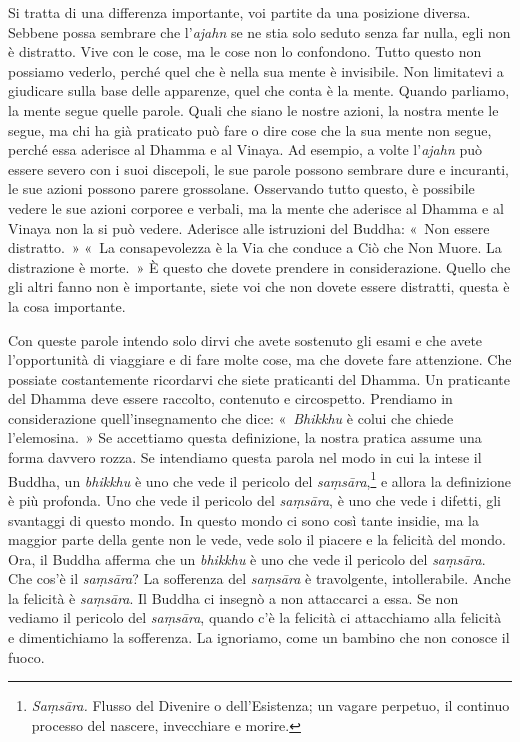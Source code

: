 Si tratta di una differenza importante, voi partite da una posizione
diversa. Sebbene possa sembrare che l'\emph{ajahn} se ne stia solo
seduto senza far nulla, egli non è distratto. Vive con le cose, ma le
cose non lo confondono. Tutto questo non possiamo vederlo, perché quel
che è nella sua mente è invisibile. Non limitatevi a giudicare sulla
base delle apparenze, quel che conta è la mente. Quando parliamo, la
mente segue quelle parole. Quali che siano le nostre azioni, la nostra
mente le segue, ma chi ha già praticato può fare o dire cose che la sua
mente non segue, perché essa aderisce al Dhamma e al Vinaya. Ad esempio,
a volte l'\emph{ajahn} può essere severo con i suoi discepoli, le sue
parole possono sembrare dure e incuranti, le sue azioni possono parere
grossolane. Osservando tutto questo, è possibile vedere le sue azioni
corporee e verbali, ma la mente che aderisce al Dhamma e al Vinaya non
la si può vedere. Aderisce alle istruzioni del Buddha: «~Non essere
distratto.~» «~La consapevolezza è la Via che conduce a Ciò che Non
Muore. La distrazione è morte.~» È questo che dovete prendere in
considerazione. Quello che gli altri fanno non è importante, siete voi
che non dovete essere distratti, questa è la cosa importante.

Con queste parole intendo solo dirvi che avete sostenuto gli esami e che
avete l'opportunità di viaggiare e di fare molte cose, ma che dovete
fare attenzione. Che possiate costantemente ricordarvi che siete
praticanti del Dhamma. Un praticante del Dhamma deve essere raccolto,
contenuto e circospetto. Prendiamo in considerazione quell'insegnamento
che dice: «~\emph{Bhikkhu} è colui che chiede l'elemosina.~» Se
accettiamo questa definizione, la nostra pratica assume una forma
davvero rozza. Se intendiamo questa parola nel modo in cui la intese il
Buddha, un \emph{bhikkhu} è uno che vede il pericolo del
\emph{saṃsāra},\footnote{\emph{Saṃsāra.} Flusso del Divenire o
  dell'Esistenza; un vagare perpetuo, il continuo processo del nascere,
  invecchiare e morire.} e allora la definizione è più profonda. Uno che
vede il pericolo del \emph{saṃsāra}, è uno che vede i difetti, gli
svantaggi di questo mondo. In questo mondo ci sono così tante insidie,
ma la maggior parte della gente non le vede, vede solo il piacere e la
felicità del mondo. Ora, il Buddha afferma che un \emph{bhikkhu} è uno
che vede il pericolo del \emph{saṃsāra}. Che cos'è il \emph{saṃsāra}? La
sofferenza del \emph{saṃsāra} è travolgente, intollerabile. Anche la
felicità è \emph{saṃsāra}. Il Buddha ci insegnò a non attaccarci a essa.
Se non vediamo il pericolo del \emph{saṃsāra}, quando c'è la felicità ci
attacchiamo alla felicità e dimentichiamo la sofferenza. La ignoriamo,
come un bambino che non conosce il fuoco.

